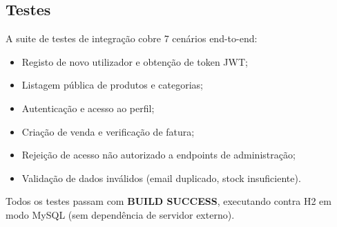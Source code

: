 \subsection{Testes}

A suite de testes de integração cobre 7 cenários end-to-end:

\begin{itemize}
    \item Registo de novo utilizador e obtenção de token JWT;
    \item Listagem pública de produtos e categorias;
    \item Autenticação e acesso ao perfil;
    \item Criação de venda e verificação de fatura;
    \item Rejeição de acesso não autorizado a endpoints de administração;
    \item Validação de dados inválidos (email duplicado, stock insuficiente).
\end{itemize}

Todos os testes passam com \textbf{BUILD SUCCESS}, executando contra H2 em modo MySQL (sem dependência de servidor externo).
